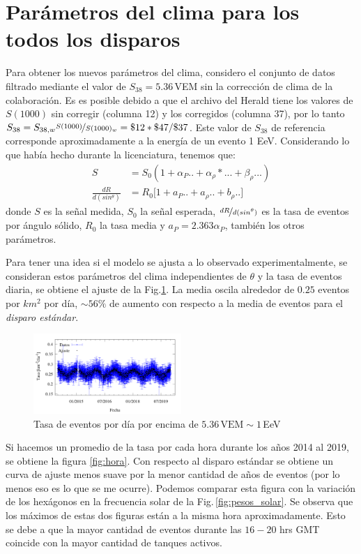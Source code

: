 \section{Parámetros del clima para los todos los disparos}

Para obtener los nuevos parámetros del clima, considero el conjunto de datos filtrado mediante el valor de $S_{38}=5.36\,$VEM sin la corrección de clima de la colaboración. Es es posible debido a que el archivo del Herald tiene los valores de $S(1000)$ sin corregir (columna 12) y los corregidos (columna 37), por lo tanto $S_{38}= S_{38,w}\nicefrac{S(1000)}{S(1000)_w} = \$12*\$47/\$37$. Este valor de $S_{38}$ de referencia corresponde aproximadamente a la energía de un evento 1 EeV. Considerando lo que había hecho durante la licenciatura, tenemos que:
\begin{align}
    S &= S_0 (1 + \alpha_P..+ \alpha_\rho*... + \beta_\rho...)\\
    \frac{dR}{d(sin^\theta)} &=  R_0 \big[ 1 + a_P.. + a_\rho ..+ b_\rho..  \big]
\end{align}
donde $S$ es la señal medida, $S_0$ la señal esperada, $\nicefrac{dR}{d(sin^\theta)}$ es la tasa de eventos por ángulo sólido, $R_0$ la tasa media y  $a_P = 2.363 \alpha_P$, también  los otros parámetros.


Para tener una idea si el modelo se ajusta a  lo observado experimentalmente, se consideran estos parámetros del clima independientes de $\theta$ y la tasa de eventos diaria, se obtiene el ajuste de la Fig.\ref{fig:tasa}. La media oscila alrededor  de $0.25$ eventos por $km^2$ por día, $\sim 56\%$ de aumento con respecto a la media de eventos para el \emph{disparo estándar}. 
\begin{figure}[H]
	\centering
	\includegraphics[width=0.5\textwidth]{figura_rate_durante_6_anhos.png}
	\caption{Tasa de eventos  por día por encima de $5.36\, \text{VEM} \sim 1 $\,EeV}
	\label{fig:tasa}
\end{figure}

Si hacemos un promedio de la tasa por cada hora durante los años 2014 al 2019, se obtiene la figura \ref{fig:hora}. Con respecto al disparo estándar se obtiene un curva de ajuste menos suave por la menor cantidad de años de eventos (por lo menos eso es lo que se me ocurre). Podemos comparar esta figura con la variación de los hexágonos en la frecuencia solar de la Fig.\,\ref{fig:pesos_solar}. Se observa que los máximos de estas dos figuras están a la misma hora aproximadamente. Esto se debe a que la mayor cantidad de eventos durante  las $16 - 20$ hrs GMT coincide con la mayor cantidad de tanques activos.

